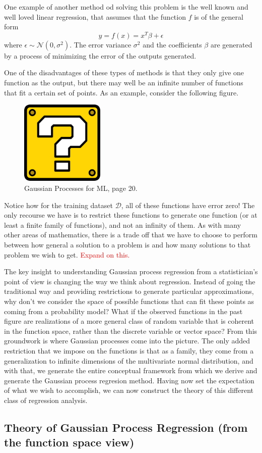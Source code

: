 One example of another method od solving this problem is the well known and well loved linear regression, that assumes that the function $f$ is of the general form 
\[ y = f(x) = x^T \beta + \epsilon \]
where $\epsilon \sim \mathcal{N}(0, \sigma^2)$. The error variance $\sigma^2$ and the coefficients $\beta$ are generated by a process of minimizing the error of the outputs generated. 

One of the disadvantages of these types of methods is that they only give one function as the output, but there may well be an infinite number of functions that fit a certain set of points. As an example, consider the following figure. 

\begin{figure}[h]
	\includegraphics[width=4cm]{Figures/missing.png}
	\centering
	\caption{Gaussian Processes for ML, page 20.}
	\label{trajectories}
\end{figure}

Notice how for the training dataset $\mathcal{D}$, all of these functions have error zero! The only recourse we have is to restrict these functions to generate one function (or at least a finite family of functions), and not an infinity of them. As with many other areas of mathematics, there is a trade off that we have to choose to perform between how general a solution to a problem is and how many solutions to that problem we wish to get. \textcolor{red}{Expand on this.} 

The key insight to understanding Gaussian process regression from a statistician's point of view is changing the way we think about regression. Instead of going the traditional way and providing restrictions to generate particular approximations, why don't we consider the space of possible functions that can fit these points as coming from a probability model? What if the observed functions in the past figure are realizations of a more general class of random variable that is coherent in the function space, rather than the discrete variable or vector space? From this groundwork is where Gaussian processes come into the picture. The only added restriction that we impose on the functions is that as a family, they come from a generalization to infinite dimensions of the multivariate normal distribution, and with that, we generate the entire conceptual framework from which we derive and generate the Gaussian process regresion method. Having now set the expectation of what we wish to accomplish, we can now construct the theory of this different class of regression analysis. 

\subsection{Theory of Gaussian Process Regression (from the function space view)}



 

